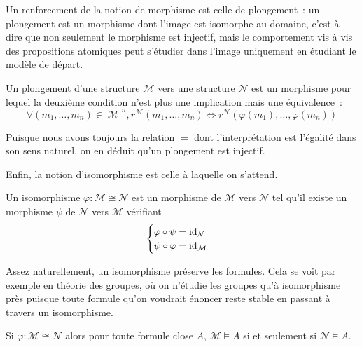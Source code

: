 Un renforcement de la notion de morphisme est celle de plongement~: un
plongement est un morphisme dont l'image est isomorphe au domaine, c'est-à-dire
que non seulement le morphisme est injectif, mais le comportement vis à vis
des propositions atomiques peut s'étudier dans l'image uniquement en étudiant le
modèle de départ.

\begin{definition}[Plongement]
  Un plongement d'une structure $\mathcal M$ vers une structure $\mathcal N$ est
  un morphisme pour lequel la deuxième condition n'est plus une implication mais
  une équivalence~:
  \[\forall(m_1,\ldots,m_n)\in|\mathcal M|^n,r^{\mathcal M}(m_1,\ldots,m_n) \iff
  r^{\mathcal N}(\varphi(m_1),\ldots,\varphi(m_n))\]
\end{definition}

\begin{remark}
  Puisque nous avons toujours la relation $=$ dont l'interprétation est
  l'égalité dans son sens naturel, on en déduit qu'un plongement est injectif.
\end{remark}

Enfin, la notion d'isomorphisme est celle à laquelle on s'attend.

\begin{definition}[Isomorphisme]
  Un isomorphisme $\varphi : \mathcal M \cong \mathcal N$ est un morphisme de
  $\mathcal M$ vers $\mathcal N$ tel qu'il existe un morphisme $\psi$ de
  $\mathcal N$ vers $\mathcal M$ vérifiant
  \[\begin{cases}
  \varphi\circ \psi = \operatorname{id}_{\mathcal N}\\
  \psi\circ\varphi = \operatorname{id}_{\mathcal M}
  \end{cases}\]
\end{definition}

Assez naturellement, un isomorphisme préserve les formules. Cela se voit par
exemple en théorie des groupes, où on n'étudie les groupes qu'à isomorphisme
près puisque toute formule qu'on voudrait énoncer reste stable en passant à
travers un isomorphisme.

\begin{proposition}
  Si $\varphi : \mathcal M \cong \mathcal N$ alors pour toute formule close $A$,
  $\mathcal M\models A$ si et seulement si $\mathcal N\models A$.
\end{proposition}

